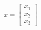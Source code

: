 \documentclass[preview]{standalone}
\begin{document}
\begin{align*}
x = \begin{bmatrix} x_1 \\ x_2 \\ x_3 \end{bmatrix}
\end{align*}
\end{document}
